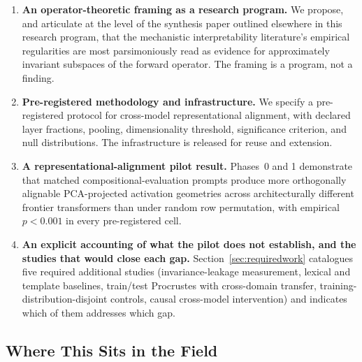 \begin{enumerate}
    \item \textbf{An operator-theoretic framing as a research program.}
        We propose, and articulate at the level of the synthesis paper
        outlined elsewhere in this research program, that the
        mechanistic interpretability literature's empirical regularities
        are most parsimoniously read as evidence for approximately
        invariant subspaces of the forward operator. The framing is a
        program, not a finding.
    \item \textbf{Pre-registered methodology and infrastructure.} We
        specify a pre-registered protocol for cross-model
        representational alignment, with declared layer fractions,
        pooling, dimensionality threshold, significance criterion, and
        null distributions. The infrastructure is released for
        reuse and extension.
    \item \textbf{A representational-alignment pilot result.} Phases~0
        and 1 demonstrate that matched compositional-evaluation prompts
        produce more orthogonally alignable PCA-projected activation
        geometries across architecturally different frontier
        transformers than under random row permutation, with empirical
        $p < 0.001$ in every pre-registered cell.
    \item \textbf{An explicit accounting of what the pilot does not
        establish, and the studies that would close each gap.}
        Section~\ref{sec:requiredwork} catalogues five required
        additional studies (invariance-leakage measurement, lexical and
        template baselines, train/test Procrustes with cross-domain
        transfer, training-distribution-disjoint controls, causal
        cross-model intervention) and indicates which of them addresses
        which gap.
\end{enumerate}

\subsection*{Where This Sits in the Field}

